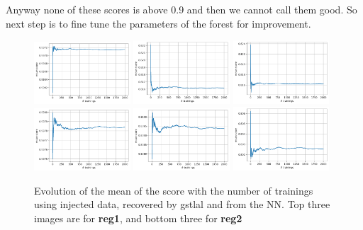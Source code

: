 \documentclass[prd,aps,twocolumn,a4paper,showkeys,nofootinbib]{revtex4-2}
\begin{document}
Anyway none of these scores is above 0.9 and then we cannot call them good. So next step is to fine tune the parameters of the forest for improvement.
\begin{figure}[]
\center
\includegraphics[width=0.32\textwidth]{./FigsClass/reg1_injmean_score}
\includegraphics[width=0.32\textwidth]{./FigsClass/reg1_gstlalmean_score}
\includegraphics[width=0.32\textwidth]{./FigsClass/reg1_NNmean_score}
\includegraphics[width=0.32\textwidth]{./FigsClass/reg2_injmean_score}
\includegraphics[width=0.32\textwidth]{./FigsClass/reg2_gstlalmean_score}
\includegraphics[width=0.32\textwidth]{./FigsClass/reg2_NNmean_score}
\caption{\label{fig:reg_mean} Evolution of the mean of the score with the number of trainings using injected data, recovered by gstlal and from the NN. Top three images are for \textbf{reg1}, and bottom three for \textbf{reg2}}
\end{figure}
\end{document}
